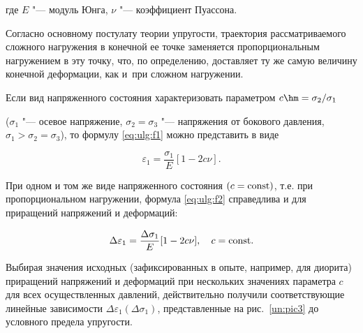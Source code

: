 где $E$ "---  модуль Юнга,  $\nu$ "--- коэффициент Пуассона.





Согласно основному постулату теории упругости, траектория рассматриваемого сложного нагружения в конечной ее точке заменяется пропорциональным нагружением в эту точку, что, по определению, доставляет ту же самую величину конечной деформации, как и~при сложном нагружении.

Если вид напряженного состояния характеризовать параметром  $c\hm=\sigma_{2}/\sigma_{1}$ 

($\sigma_1$ "--- осевое напряжение, $\sigma_2=\sigma_3$ "--- напряжения от бокового давления, ${\sigma_1>\sigma_2=\sigma_3}$), то формулу \eqref{eq:ulg:f1} можно представить в виде

\begin{equation} \label{eq:ulg:f2} 

\varepsilon_1=\frac{\sigma_1}{E}[1-2c\nu].

\end{equation}

При одном и том же виде напряженного состояния $(c={\rm const})$, т.е. при пропорциональном нагружении, формула \eqref{eq:ulg:f2} справедлива и для приращений напряжений и деформаций:

\begin{equation} \label{eq:ulg:f3} 

\Delta\varepsilon_1=\frac{\Delta\sigma_1}{E}[1-2c\nu],  \quad c={\rm const}.

\end{equation}



Выбирая значения исходных (зафиксированных в опыте, например, для диорита) приращений напряжений и деформаций при нескольких значениях параметра $c$ для всех осуществленных давлений, действительно получили соответствующие линейные зависимости $\Delta\varepsilon_1(\Delta\sigma_1)$, представленные на рис.~\ref{un:pic3} до условного предела упругости.



